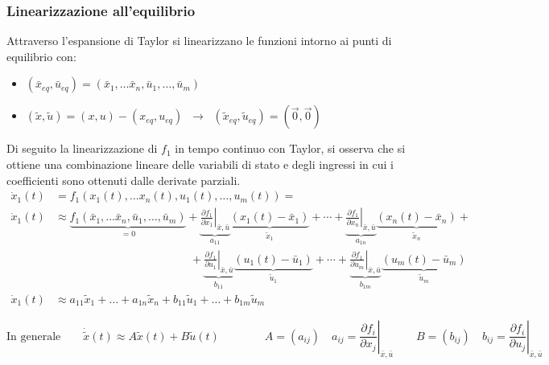 \subsubsection*{Linearizzazione all'equilibrio}
Attraverso l'espansione di Taylor si linearizzano le funzioni intorno ai punti di equilibrio con:
\begin{itemize}
	\item \((\bar{x}_{eq},\bar{u}_{eq}) = (\bar{x}_1, \dots \bar{x}_n, \bar{u}_1, \dots, \bar{u}_m)\)
	\item \((\tilde{x},\tilde{u}) = (x,u)-(x_{eq},u_{eq}) \;\; \rightarrow \;\; (\tilde{x}_{eq},\tilde{u}_{eq}) = (\vec{0},\vec{0})\)
\end{itemize}

\vspace{10pt}
\noindent
Di seguito la linearizzazione di \(f_1\) in tempo continuo con Taylor, si osserva che si ottiene una combinazione lineare delle
variabili di stato e degli ingressi in cui i coefficienti sono ottenuti dalle derivate parziali.
\begin{align*}
	\dot{x}_1(t) &= f_1(x_1(t), \dots x_n(t), u_1(t), \dots, u_m(t)) = \\
	\dot{x}_1(t) &\approx \underbrace{f_1(\bar{x}_1, \dots \bar{x}_n, \bar{u}_1, \dots, \bar{u}_m)}_{=0} + \underbrace{ \left. \frac{\partial f_1}{\partial x_1} \right|_{\bar{x}, \bar{u}} }_{{a_{11}}} \underbrace{ \left( x_1(t) - \bar{x}_1 \right) }_{\tilde{x}_1} + \cdots + \underbrace{ \left. \frac{\partial f_1}{\partial x_n} \right|_{\bar{x}, \bar{u}} }_{a_{1n}} \underbrace{ \left( x_n(t) - \bar{x}_n \right) }_{\tilde{x}_n} + \\
	&\qquad\qquad\qquad\qquad\qquad\qquad + \underbrace{ \left. \frac{\partial f_1}{\partial u_1} \right|_{\bar{x}, \bar{u}} }_{{b_{11}}} \underbrace{ \left( u_1(t) - \bar{u}_1 \right) }_{\tilde{u}_1} + \cdots + \underbrace{ \left. \frac{\partial f_1}{\partial u_m} \right|_{\bar{x}, \bar{u}} }_{b_{1m}} \underbrace{ \left( u_m(t) - \bar{u}_m \right) }_{\tilde{u}_m} \\
	\dot{x}_1(t) &\approx a_{11} \tilde{x}_1 + \dots + a_{1n} \tilde{x}_n + b_{11} \tilde{u}_1 + \dots + b_{1m} \tilde{u}_m
\end{align*}

\[\text{In generale} \qquad \dot{\tilde{x}}(t) \approx A \tilde{x}(t) + B \tilde{u}(t) \qquad\qquad A = (a_{ij}) \quad a_{ij} = \left. \frac{\partial f_i}{\partial x_j} \right|_{\bar{x}, \bar{u}} \qquad B = (b_{ij}) \quad b_{ij} = \left. \frac{\partial f_i}{\partial u_j} \right|_{\bar{x}, \bar{u}}\]

